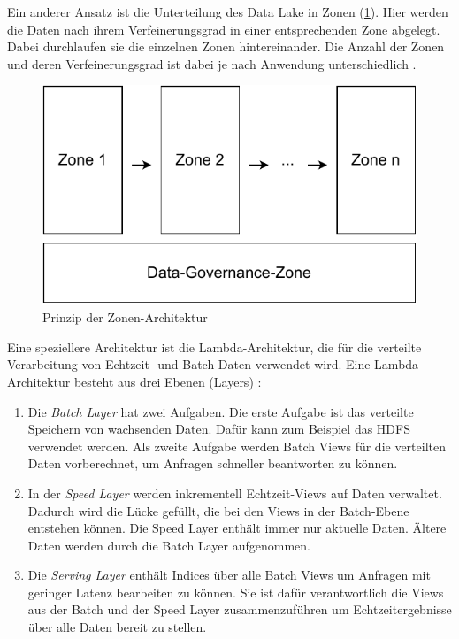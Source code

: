 Ein anderer Ansatz ist die Unterteilung des Data Lake in Zonen (\cref{fig:datalake-zones}).
Hier werden die Daten nach ihrem Verfeinerungsgrad in einer entsprechenden Zone abgelegt.
Dabei durchlaufen sie die einzelnen Zonen hintereinander.
Die Anzahl der Zonen und deren Verfeinerungsgrad ist dabei je nach Anwendung unterschiedlich \parencite{dl-zones}.

\begin{figure}
    \centering
    \includegraphics[width=.8\textwidth]{Grafiken/Grundlagen-Zones.pdf}
    \caption{Prinzip der Zonen-Architektur}
    \label{fig:datalake-zones}
\end{figure}

Eine speziellere Architektur ist die Lambda-Architektur, die für die verteilte Verarbeitung von Echtzeit- und Batch-Daten verwendet wird.
Eine Lambda-Architektur besteht aus drei Ebenen (Layers) \parencite{lambda-arch}: \begin{enumerate}
    \item Die \emph{Batch Layer} hat zwei Aufgaben.
          Die erste Aufgabe ist das verteilte Speichern von wachsenden Daten.
          Dafür kann zum Beispiel das HDFS verwendet werden.
          Als zweite Aufgabe werden Batch Views für die verteilten Daten vorberechnet, um Anfragen schneller beantworten zu können.
    \item In der \emph{Speed Layer} werden inkrementell Echtzeit-Views auf Daten verwaltet.
          Dadurch wird die Lücke gefüllt, die bei den Views in der Batch-Ebene entstehen können.
          Die Speed Layer enthält immer nur aktuelle Daten.
          Ältere Daten werden durch die Batch Layer aufgenommen.
    \item Die \emph{Serving Layer} enthält Indices über alle Batch Views um Anfragen mit geringer Latenz bearbeiten zu können. Sie ist dafür verantwortlich die Views aus der Batch und der Speed Layer zusammenzuführen um Echtzeitergebnisse über alle Daten bereit zu stellen.
\end{enumerate}

